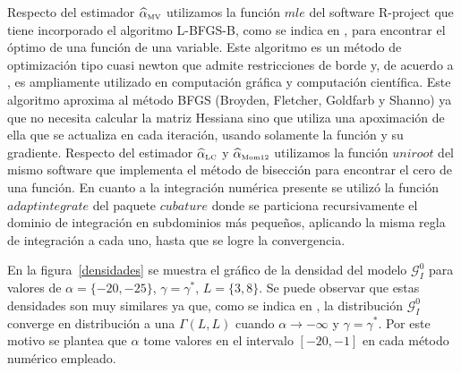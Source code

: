 Respecto del estimador $\widehat{\alpha}_{{\text{\tiny{MV}}}}$ utilizamos la función $mle$ del software R-project que tiene incorporado el algoritmo L-BFGS-B, como se indica en \citet{Byrd1995}, para encontrar el óptimo de una función de una variable. Este algoritmo es un método de optimización tipo cuasi newton que admite restricciones de borde y, de acuerdo a \citet{Fei2014}, es ampliamente utilizado en computación gráfica y computación científica. Este algoritmo aproxima al método BFGS (Broyden, Fletcher, Goldfarb y Shanno) ya que no necesita calcular la matriz Hessiana sino que utiliza una apoximación de ella que se actualiza en cada iteración, usando solamente la función y su gradiente. 
Respecto del estimador $\widehat{\alpha}_{{\text{\tiny{LC}}}}$ y $\widehat{\alpha}_{{\text{\tiny{Mom12}}}}$ utilizamos la función $uniroot$ del mismo software que implementa el método de bisección para encontrar el cero de una función. En cuanto a la integración numérica presente se utilizó la función $\textit{adaptintegrate}$ del paquete $\textit{cubature}$ donde se particiona recursivamente el dominio de integración
en subdominios más pequeños, aplicando la misma regla de integración a cada uno, hasta que se logre la convergencia.




En la figura~\ref{densidades} se muestra el gráfico de la densidad del modelo $\mathcal{G}_I^0$ para valores de $\alpha=\{-20,-25\}$, $\gamma=\gamma^*$, $L=\{3,8\}$. Se puede observar que estas densidades son muy similares ya que, como se indica en \citet{Frery99}, la distribución $\mathcal{G}_I^0$ converge en distribución a una $\Gamma(L,L)$ cuando $\alpha \longrightarrow -\infty$ y $\gamma=\gamma^*$. Por este motivo se plantea que $\alpha$ tome valores en el intervalo $[-20,-1]$ en cada método numérico empleado. 

